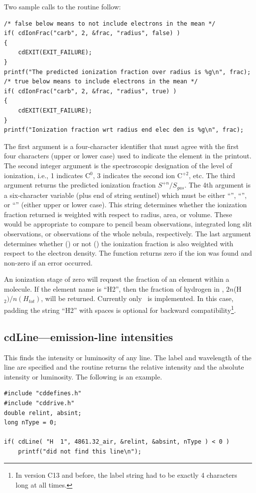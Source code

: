 Two sample calls to the routine follow:
\begin{verbatim}
/* false below means to not include electrons in the mean */
if( cdIonFrac("carb", 2, &frac, "radius", false) )
{
    cdEXIT(EXIT_FAILURE);
}
printf("The predicted ionization fraction over radius is %g\n", frac);
/* true below means to include electrons in the mean */
if( cdIonFrac("carb", 2, &frac, "radius", true) )
{
    cdEXIT(EXIT_FAILURE);
}
printf("Ionization fraction wrt radius end elec den is %g\n", frac);
\end{verbatim}
The first argument is a four-character identifier that must agree with the
first four characters (upper or lower case) used to indicate the element
in the printout.  The second integer argument is the spectroscopic
designation of the level of ionization, i.e., 1 indicates C$^0$,
3 indicates the second ion C$^{+2}$, etc.
The third argument returns the predicted ionization
fraction $S^{+n}/S_{gas}$.
The 4th argument is a six-character variable (plus end
of string sentinel) which must be either ``'', ``'', or
``'' (either
upper or lower case).
This string determines whether the ionization fraction
returned is weighted with respect to radius, area, or volume.
These would be appropriate to compare to pencil beam observations,
integrated long slit observations, or observations of the whole nebula, respectively.
The last argument
determines whether () or not ()
the ionization fraction is also
weighted with respect to the electron density.
The function returns zero
if the ion was found and non-zero if an error occurred.

An ionization stage of zero will request the fraction of an element
within a molecule.
If the element name is ``H2'', then the fraction of hydrogen in \htwo,
$2n$(H$_2)/n(H_{tot})$, will
be returned.  Currently only \htwo\ is implemented.
In this case, padding the
string ``H2'' with spaces is optional for backward compatibility\footnote{In
  version C13 and before, the label string had to be exactly 4 characters
  long at all times.}.

\subsection{cdLine---emission-line intensities }

This finds the intensity or luminosity of any line.  The label and
wavelength of the line are specified and the routine returns the relative
intensity and the absolute intensity or luminosity.
The following is an example.
\begin{verbatim}
#include "cddefines.h"
#include "cddrive.h"
double relint, absint;
long nType = 0;

if( cdLine( "H  1", 4861.32_air, &relint, &absint, nType ) < 0 )
    printf("did not find this line\n");
\end{verbatim}


